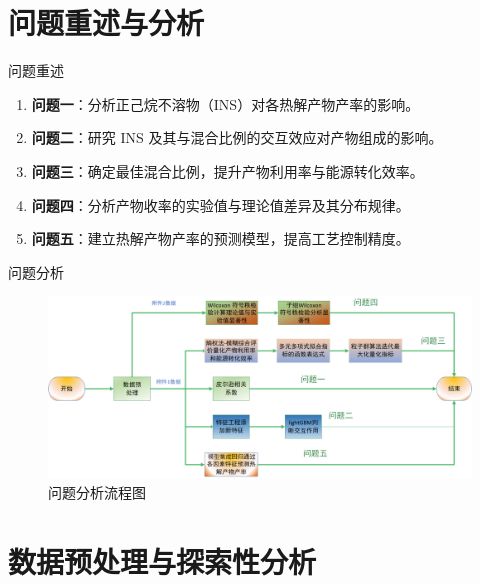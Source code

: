 \documentclass{beamer}
\begin{document}
\section{问题重述与分析}
\begin{frame}{问题重述}
    \justifying
    \begin{enumerate}[<+->]
        \item \textbf{问题一}：分析正己烷不溶物（INS）对各热解产物产率的影响。
        \item \textbf{问题二}：研究 INS 及其与混合比例的交互效应对产物组成的影响。
        \item \textbf{问题三}：确定最佳混合比例，提升产物利用率与能源转化效率。
        \item \textbf{问题四}：分析产物收率的实验值与理论值差异及其分布规律。
        \item \textbf{问题五}：建立热解产物产率的预测模型，提高工艺控制精度。
    \end{enumerate}
\end{frame}
\begin{frame}{问题分析}
    \justifying
    \begin{figure}[htbp]
        \centering
        \includegraphics[width=0.94\linewidth]{pic/问题分析.png} %
        \caption{问题分析流程图}
        \label{fig:problem-analysis}
    \end{figure}
\end{frame}


\section{数据预处理与探索性分析}
\end{document}
